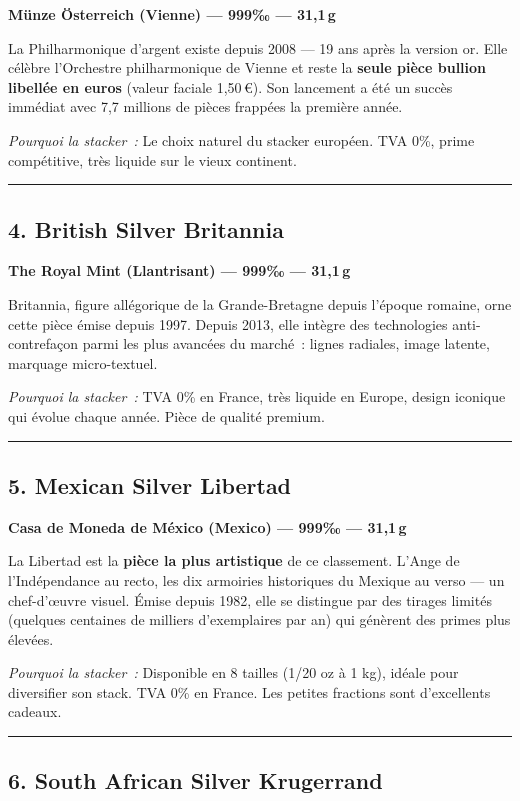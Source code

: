 \documentclass[14pt,a4paper]{extarticle}
\newcommand{\permil}{‰}
\newcommand{\goldsep}{%
  \begin{center}
    \textcolor{gold}{\rule{6cm}{0.4pt}}
  \end{center}
}
\begin{document}
\textbf{Münze Österreich (Vienne) --- 999\permil{} --- 31,1\,g}

La Philharmonique d'argent existe depuis 2008 --- 19 ans après la version or. Elle célèbre l'Orchestre philharmonique de Vienne et reste la \textbf{seule pièce bullion libellée en euros} (valeur faciale 1,50\,€). Son lancement a été un succès immédiat avec 7,7 millions de pièces frappées la première année.

\textit{Pourquoi la stacker~:} Le choix naturel du stacker européen. TVA 0\%, prime compétitive, très liquide sur le vieux continent.


\goldsep

\subsection{4. British Silver Britannia}

\textbf{The Royal Mint (Llantrisant) --- 999\permil{} --- 31,1\,g}

Britannia, figure allégorique de la Grande-Bretagne depuis l'époque romaine, orne cette pièce émise depuis 1997. Depuis 2013, elle intègre des technologies anti-contrefaçon parmi les plus avancées du marché~: lignes radiales, image latente, marquage micro-textuel.

\textit{Pourquoi la stacker~:} TVA 0\% en France, très liquide en Europe, design iconique qui évolue chaque année. Pièce de qualité premium.

\goldsep

\subsection{5. Mexican Silver Libertad}

\textbf{Casa de Moneda de México (Mexico) --- 999\permil{} --- 31,1\,g}

La Libertad est la \textbf{pièce la plus artistique} de ce classement. L'Ange de l'Indépendance au recto, les dix armoiries historiques du Mexique au verso --- un chef-d'\oe uvre visuel. Émise depuis 1982, elle se distingue par des tirages limités (quelques centaines de milliers d'exemplaires par an) qui génèrent des primes plus élevées.

\textit{Pourquoi la stacker~:} Disponible en 8 tailles (1/20 oz à 1 kg), idéale pour diversifier son stack. TVA 0\% en France. Les petites fractions sont d'excellents cadeaux.

\goldsep

\subsection{6. South African Silver Krugerrand}
\end{document}
